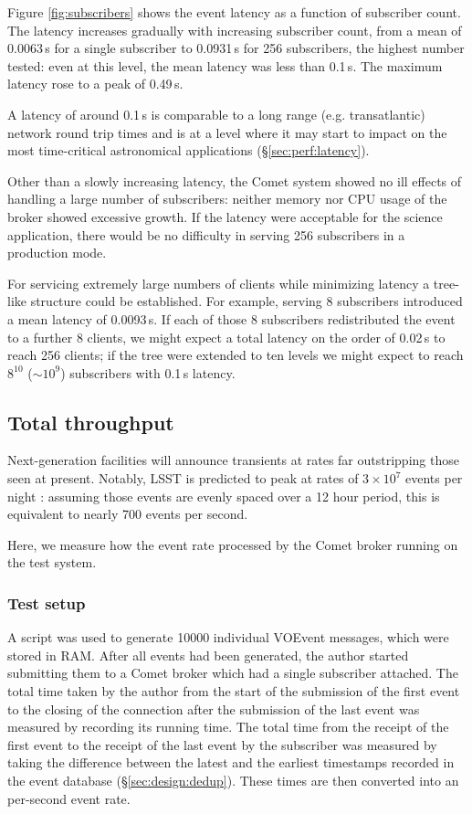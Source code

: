 \documentclass[5p,authoryear]{elsarticle}
\begin{document}
Figure \ref{fig:subscribers} shows the event latency as a function of
subscriber count. The latency increases gradually with increasing subscriber
count, from a mean of 0.0063\,s for a single subscriber to 0.0931\,s for 256
subscribers, the highest number tested: even at this level, the mean latency
was less than 0.1\,s. The maximum latency rose to a peak of 0.49\,s.

A latency of around 0.1\,s is comparable to a long range (e.g. transatlantic)
network round trip times and is at a level where it may start to impact on the
most time-critical astronomical applications (\S\ref{sec:perf:latency}).

Other than a slowly increasing latency, the Comet system showed no
ill effects of handling a large number of subscribers: neither memory nor CPU
usage of the broker showed excessive growth. If the latency were acceptable
for the science application, there would be no difficulty in serving 256
subscribers in a production mode.

For servicing extremely large numbers of clients while minimizing latency a
tree-like structure could be established. For example, serving 8 subscribers
introduced a mean latency of 0.0093\,s. If each of those 8 subscribers
redistributed the event to a further 8 clients, we might expect a total
latency on the order of 0.02\,s to reach 256 clients; if the tree were
extended to ten levels we might expect to reach $8^{10}$ ($\sim 10^9$)
subscribers with 0.1\,s latency.

\subsection{Total throughput}
\label{sec:perf:total}

Next-generation facilities will announce transients at rates far outstripping
those seen at present. Notably, LSST is predicted to peak at rates of
$3\times10^7$ events per night \citep{Kantor:2014}: assuming those events are
evenly spaced over a 12 hour period, this is equivalent to nearly 700 events
per second.

Here, we measure how the event rate processed by the Comet broker running on
the test system.

\subsubsection{Test setup}
\label{sec:perf:total:setup}

A script was used to generate 10000 individual VOEvent messages, which were
stored in RAM. After all events had been generated, the author started
submitting them to a Comet broker which had a single subscriber attached. The
total time taken by the author from the start of the submission of the first
event to the closing of the connection after the submission of the last event
was measured by recording its running time. The total time from the receipt of
the first event to the receipt of the last event by the subscriber was
measured by taking the difference between the latest and the earliest
timestamps recorded in the event database (\S\ref{sec:design:dedup}). These
times are then converted into an per-second event rate.
\end{document}
